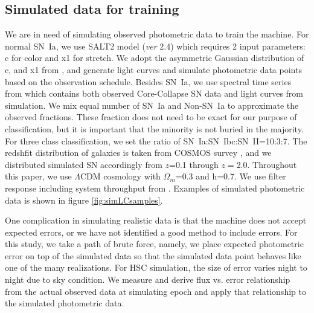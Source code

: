 \documentclass[useamsfonts]{pasj01}
\begin{document}
\subsection{Simulated data for training}
\label{sec:training}
We are in need of simulating observed photometric data to train the machine.  
For normal SN~Ia, we use SALT2 \citep{guy10b} model ({\it ver} 2.4) which requires 2 input parameters: c for color and x1 for stretch.
We adopt the asymmetric Gaussian distribution of c, and x1 from \citet{mosher14a}, and generate
light curves and simulate photometric data points based on the observation schedule. 
Besides SN~Ia, we use spectral time series from \citet{kessler19b} which contains both observed Core-Collapse SN data and light curves from simulation.
We mix equal number of SN~Ia and Non-SN~Ia to approximate the observed fractions. 
These fraction does not need to be exact for our purpose of classification, but it is important
that the minority is not buried in the majority.
For three class classification, we set the ratio of SN~Ia:SN~Ibc:SN~II=10:3:7.
The redshfit distribution of galaxies is taken from COSMOS survey \citep{laigle16a}, and we distributed simulated SN accordingly from $z$=0.1 through $z=$2.0.
Throughout this paper, we use $\Lambda$CDM cosmology with $\Omega_{m}$=0.3 and h=0.7.
We use filter response including system throughput from \citet{kawanomoto18a}. 
Examples of simulated photometric data is shown in figure \ref{fig:simLCsamples}.

One complication in simulating realistic data is that the machine does not accept expected errors, or we have not identified a good method to include errors.   
For this study, we take a path of brute force, namely, we place expected photometric error on top of the simulated data so that the simulated data point behaves like one of the many realizations.
For HSC simulation, the size of error varies night to night due to sky condition. 
We measure and derive flux vs. error relationship from the actual observed data at simulating epoch and apply that relationship to the simulated photometric data.
\end{document}
